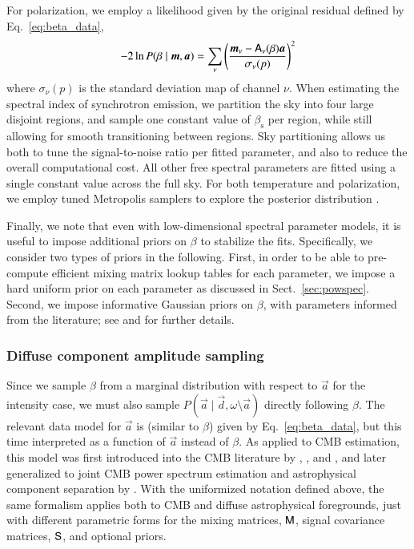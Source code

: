 \documentclass[twocolumn]{aa}
\renewcommand{\d}[0]{\vec{d}}
\newcommand{\A}[0]{\tens{A}}
\renewcommand{\a}[0]{\vec{a}}
\newcommand{\m}[0]{\vec{m}}
\newcommand{\M}[0]{\tens{M}}
\renewcommand{\S}[0]{\tens{S}}
\begin{document}
For polarization, we employ a likelihood given by the original
residual defined by Eq.~\eqref{eq:beta_data}, 
\begin{equation}
  -2\ln P(\beta\mid \m, \a) = \sum_{\nu}\left(\frac{\m_{\nu} - \A_{\nu}(\beta)\a}{\sigma_{\nu}(p)}\right)^2
\label{eq:beta_cond}
\end{equation}
where $\sigma_{\nu}(p)$ is the standard deviation map of channel
$\nu$.
When estimating the spectral index of synchrotron emission, we
partition the sky into four large disjoint regions, and sample one
constant value of $\beta_{\mathrm{s}}$ per region, while still
allowing for smooth transitioning between regions. Sky partitioning
allows us both to tune the signal-to-noise ratio per fitted parameter,
and also to reduce the overall computational cost. All other free
spectral parameters are fitted using a single constant value across
the full sky. For both temperature and polarization, we employ tuned
Metropolis samplers to explore the posterior distribution
\citep{bp13,bp14}.

Finally, we note that even with low-dimensional spectral parameter
models, it is useful to impose additional priors on $\beta$ to
stabilize the fits. Specifically, we consider two types of priors in
the following. First, in order to be able to pre-compute efficient
mixing matrix lookup tables for each parameter, we impose a hard
uniform prior on each parameter as discussed in
Sect.~\ref{sec:powspec}. Second, we impose informative Gaussian priors
on $\beta$, with parameters informed from the literature; see
\citet{bp13} and \citet{bp14} for further details.

\subsubsection{Diffuse component amplitude sampling}
\label{sec:sigamp}  

Since we sample $\beta$ from a marginal distribution with respect to
$\a$ for the intensity case, we must also sample $P(\a\mid \d,
\omega\setminus\a)$ directly following $\beta$. The relevant data
model for $\a$ is (similar to $\beta$) given by
Eq.~\eqref{eq:beta_data}, but this time interpreted as a function of
$\a$ instead of $\beta$. As applied to CMB estimation, this model was
first introduced into the CMB literature by
\citet{jewell2004}, 
\citet{wandelt2004},
and \citet{eriksen:2004}, and later generalized to
joint CMB power spectrum estimation and astrophysical component
separation by \citet{eriksen2008}. With the uniformized notation
defined above, the same formalism applies both to CMB and diffuse
astrophysical foregrounds, just with different parametric forms for
the mixing matrices, $\M$, signal covariance matrices, $\S$, and
optional priors.
\end{document}
